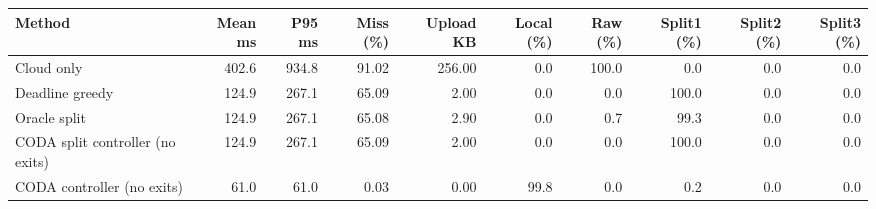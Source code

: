 \begin{tabular}{lrrrrrrrrr}
\toprule
Method & Mean ms & P95 ms & Miss (\%) & Upload KB & Local (\%) & Raw (\%) & Split1 (\%) & Split2 (\%) & Split3 (\%) \\
\midrule
Cloud only & 402.6 & 934.8 & 91.02 & 256.00 & 0.0 & 100.0 & 0.0 & 0.0 & 0.0 \\
Deadline greedy & 124.9 & 267.1 & 65.09 & 2.00 & 0.0 & 0.0 & 100.0 & 0.0 & 0.0 \\
Oracle split & 124.9 & 267.1 & 65.08 & 2.90 & 0.0 & 0.7 & 99.3 & 0.0 & 0.0 \\
CODA split controller (no exits) & 124.9 & 267.1 & 65.09 & 2.00 & 0.0 & 0.0 & 100.0 & 0.0 & 0.0 \\
CODA controller (no exits) & 61.0 & 61.0 & 0.03 & 0.00 & 99.8 & 0.0 & 0.2 & 0.0 & 0.0 \\
\bottomrule
\end{tabular}
